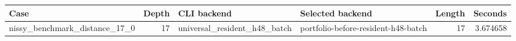 {\small
\begin{tabular}{lrllrr}
\hline
Case & Depth & CLI backend & Selected backend & Length & Seconds \\
\hline
nissy\_benchmark\_distance\_17\_0 & 17 & universal\_resident\_h48\_batch & portfolio-before-resident-h48-batch & 17 & 3.674658 \\
\hline
\end{tabular}
}

